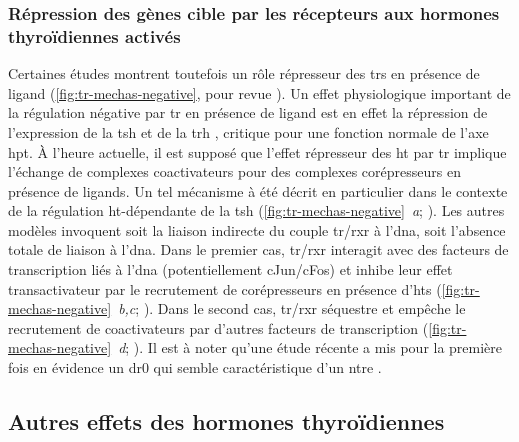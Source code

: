 \documentclass[../main.tex]{subfiles}
\begin{document}
			

		\subsubsection{Répression des gènes cible par les récepteurs aux hormones thyroïdiennes activés}
			Certaines études montrent toutefois un rôle répresseur des \glspl{tr} en présence de ligand (\autoref{fig:tr-mechas-negative}, pour revue \citealp{Lazar2003,Weitzel2008}).
			Un effet physiologique important de la régulation négative par \gls{tr} en présence de ligand est en effet la répression de l'expression de la \gls{tsh} et de la \gls{trh} \citep{Dupre2004}, critique pour une fonction normale de l'axe \gls{hpt}.
			À l'heure actuelle, il est supposé que l'effet répresseur des \gls{ht} par \gls{tr} implique l'échange de complexes coactivateurs pour des complexes corépresseurs en présence de ligands.
			Un tel mécanisme à été décrit en particulier dans le contexte de la régulation \gls{ht}-dépendante de la \gls{tsh} (\autoref{fig:tr-mechas-negative}~\textit{a}; \citealp{Sasaki1999}).
			Les autres modèles invoquent soit la liaison indirecte du couple \gls{tr}/\gls{rxr} à l'\gls{dna}, soit l'absence totale de liaison à l'\gls{dna}.
			Dans le premier cas, \gls{tr}/\gls{rxr} interagit avec des facteurs de transcription liés à l'\gls{dna} (potentiellement cJun/cFos) et inhibe leur effet transactivateur par le recrutement de corépresseurs en présence d'\glspl{ht} (\autoref{fig:tr-mechas-negative}~\textit{b,c}; \citealp{Matsushita2007}).
			Dans le second cas, \gls{tr}/\gls{rxr} séquestre et empêche le recrutement de coactivateurs par d'autres facteurs de transcription (\autoref{fig:tr-mechas-negative}~\textit{d}; \citealp{Wulf2008}).
			Il est à noter qu'une étude récente a mis pour la première fois en évidence un \gls{dr0} qui semble caractéristique d'un \gls{ntre} \citep{Ramadoss2014}.

			


	\subsection{Autres effets des hormones thyroïdiennes}
\end{document}
